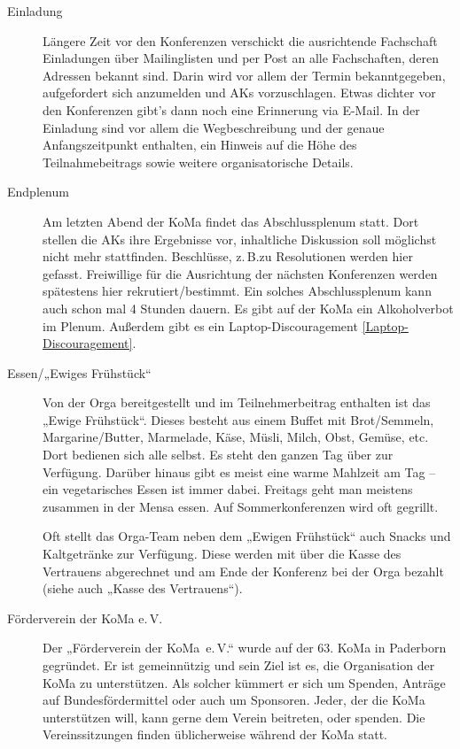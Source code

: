\begin{description}
\item[Einladung]
    Längere Zeit vor den Konferenzen verschickt die ausrichtende Fachschaft Einladungen über Mailinglisten und per Post an alle Fachschaften, deren Adressen bekannt sind. Darin wird vor allem der Termin bekanntgegeben, aufgefordert sich anzumelden und AKs vorzuschlagen. Etwas dichter vor den Konferenzen gibt’s dann noch eine Erinnerung via E-Mail. In der Einladung sind vor allem die Wegbeschreibung und der genaue Anfangszeitpunkt enthalten, ein Hinweis auf die Höhe des Teilnahmebeitrags sowie weitere organisatorische Details.

\item[Endplenum]
    Am letzten Abend der KoMa findet das Abschlussplenum statt. Dort stellen die AKs ihre Ergebnisse vor, inhaltliche Diskussion soll möglichst nicht mehr stattfinden. Beschlüsse, z.\,B.\@ zu Resolutionen werden hier gefasst. Freiwillige für die Ausrichtung der nächsten Konferenzen werden spätestens hier rekrutiert/bestimmt. Ein solches Abschlussplenum kann auch schon mal 4 Stunden dauern. Es gibt auf der KoMa ein Alkoholverbot im Plenum. Außerdem gibt es ein Laptop-Discouragement \ref{Laptop-Discouragement}.

\item[Essen/„Ewiges Frühstück“]
    Von der Orga bereitgestellt und im Teilnehmerbeitrag enthalten ist das „Ewige Frühstück“. Dieses besteht aus einem Buffet mit Brot/Semmeln, Margarine/Butter, Marmelade, Käse, Müsli, Milch, Obst, Gemüse, etc. Dort bedienen sich alle selbst. Es steht den ganzen Tag über zur Verfügung. Darüber hinaus gibt es meist eine warme Mahlzeit am Tag -- ein vegetarisches Essen ist immer dabei. Freitags geht man meistens zusammen in der Mensa essen. Auf Sommerkonferenzen wird oft gegrillt.

	Oft stellt das Orga-Team neben dem „Ewigen Frühstück“ auch Snacks und Kaltgetränke zur Verfügung. Diese werden mit über die Kasse des Vertrauens abgerechnet und am Ende der Konferenz bei der Orga bezahlt (siehe auch „Kasse des Vertrauens“).

\item[Förderverein der KoMa e.\,V.]
    Der „Förderverein der KoMa~e.\,V.“ wurde auf der 63. KoMa in Paderborn gegründet. Er ist gemeinnützig und sein Ziel ist es, die Organisation der KoMa zu unterstützen. Als solcher kümmert er sich um Spenden, Anträge auf Bundesfördermittel oder auch um Sponsoren. Jeder, der die KoMa unterstützen will, kann gerne dem Verein beitreten, oder spenden. Die Vereinssitzungen finden üblicherweise während der KoMa statt.


\end{description}
